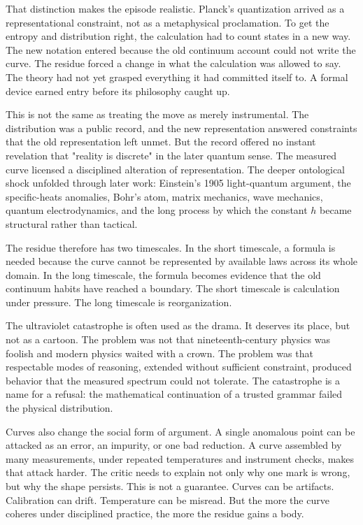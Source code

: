 That distinction makes the episode realistic. Planck's quantization
arrived as a representational constraint, not as a metaphysical
proclamation. To get the entropy and distribution right, the calculation
had to count states in a new way. The new notation entered because the
old continuum account could not write the curve. The residue forced a
change in what the calculation was allowed to say. The theory had not yet
grasped everything it had committed itself to. A formal device earned
entry before its philosophy caught up.

This is not the same as treating the move as merely instrumental. The
distribution was a public record, and the new representation answered
constraints that the old representation left unmet. But the record offered no instant
revelation that "reality is discrete" in the later quantum sense. The
measured curve licensed a disciplined alteration of representation. The
deeper ontological shock unfolded through later work: Einstein's 1905
light-quantum argument, the specific-heats anomalies, Bohr's atom, matrix
mechanics, wave mechanics, quantum electrodynamics, and the long process
by which the constant $h$ became structural rather than tactical.

The residue therefore has two timescales. In the short timescale, a
formula is needed because the curve cannot be represented by available
laws across its whole domain. In the long timescale, the formula becomes
evidence that the old continuum habits have reached a boundary. The short
timescale is calculation under pressure. The long timescale is
reorganization.

The ultraviolet catastrophe is often used as the drama. It deserves its
place, but not as a cartoon. The problem was not that nineteenth-century
physics was foolish and modern physics waited with a crown. The problem
was that respectable modes of reasoning, extended without sufficient
constraint, produced behavior that the measured spectrum could not
tolerate. The catastrophe is a name for a refusal: the mathematical
continuation of a trusted grammar failed the physical distribution.

Curves also change the social form of argument. A single anomalous point
can be attacked as an error, an impurity, or one bad reduction. A curve
assembled by many measurements, under repeated temperatures and
instrument checks, makes that attack harder. The critic needs to explain
not only why one mark is wrong, but why the shape persists. This is not
a guarantee. Curves can be artifacts. Calibration can drift. Temperature
can be misread. But the more the curve coheres under disciplined
practice, the more the residue gains a body.

